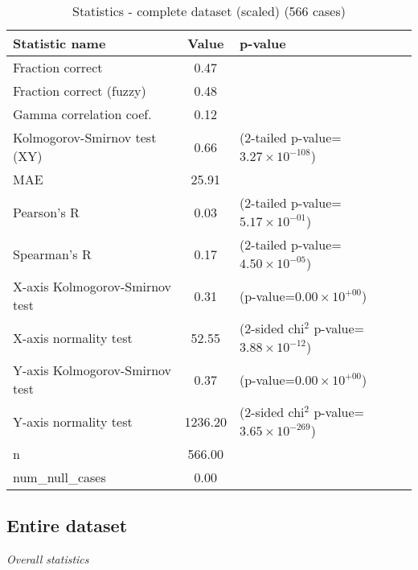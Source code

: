 \documentclass[10pt, letterpaper, oneside, titlepage, landscape]{scrreprt}
\begin{document}
\begin{table}[H]\begin{center}
\begin{tabular}{ l S[table-format=3.2] l}
Statistic name & {Value} & p-value\\
\hline
Fraction correct & 0.47 & \\
Fraction correct (fuzzy) & 0.48 & \\
Gamma correlation coef. & 0.12 & \\
Kolmogorov-Smirnov test (XY) & 0.66 & (2-tailed p-value=$3.27\times10^{-108}$)\\
MAE & 25.91 & \\
Pearson's R & 0.03 & (2-tailed p-value=$5.17\times10^{-01}$)\\
Spearman's R & 0.17 & (2-tailed p-value=$4.50\times10^{-05}$)\\
X-axis Kolmogorov-Smirnov test & 0.31 & (p-value=$0.00\times10^{+00}$)\\
X-axis normality test & 52.55 & (2-sided chi$^{2}$ p-value=$3.88\times10^{-12}$)\\
Y-axis Kolmogorov-Smirnov test & 0.37 & (p-value=$0.00\times10^{+00}$)\\
Y-axis normality test & 1236.20 & (2-sided chi$^{2}$ p-value=$3.65\times10^{-269}$)\\
n & 566.00 & \\
num\_null\_cases & 0.00 & \\
\end{tabular}
\caption{Statistics - complete dataset (scaled) (566 cases)}
\end{center}\end{table}


\subsection{Entire dataset}
\textit{Overall statistics}
\end{document}
